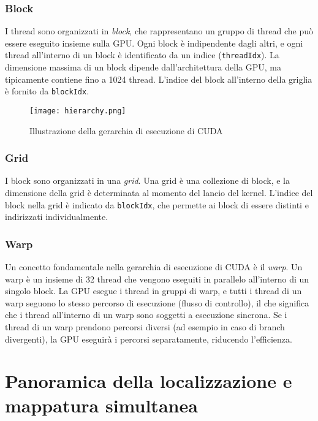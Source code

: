 \documentclass[12pt,a4paper]{report}
\begin{document}
\subsection*{Block}
I thread sono organizzati in \textit{block}, che rappresentano un gruppo di thread che può essere eseguito insieme sulla GPU. Ogni block è indipendente dagli altri, e ogni thread all'interno di un block è identificato da un indice (\texttt{threadIdx}). La dimensione massima di un block dipende dall'architettura della GPU, ma tipicamente contiene fino a 1024 thread. L'indice del block all'interno della griglia è fornito da \texttt{blockIdx}.

\begin{figure}[h]
    \centering
    \texttt{[image: hierarchy.png]}
    \caption{Illustrazione della gerarchia di esecuzione di CUDA \cite{CUDAhierarchy}}
\end{figure}

\subsection*{Grid}
I block sono organizzati in una \textit{grid}. Una grid è una collezione di block, e la dimensione della grid è determinata al momento del lancio del kernel. L'indice del block nella grid è indicato da \texttt{blockIdx}, che permette ai block di essere distinti e indirizzati individualmente.



\subsection*{Warp}
Un concetto fondamentale nella gerarchia di esecuzione di CUDA è il \textit{warp}. Un warp è un insieme di 32 thread che vengono eseguiti in parallelo all'interno di un singolo block. La GPU esegue i thread in gruppi di warp, e tutti i thread di un warp seguono lo stesso percorso di esecuzione (flusso di controllo), il che significa che i thread all'interno di un warp sono soggetti a esecuzione sincrona. Se i thread di un warp prendono percorsi diversi (ad esempio in caso di branch divergenti), la GPU eseguirà i percorsi separatamente, riducendo l'efficienza.







\chapter{Panoramica della localizzazione e mappatura simultanea }
\end{document}
